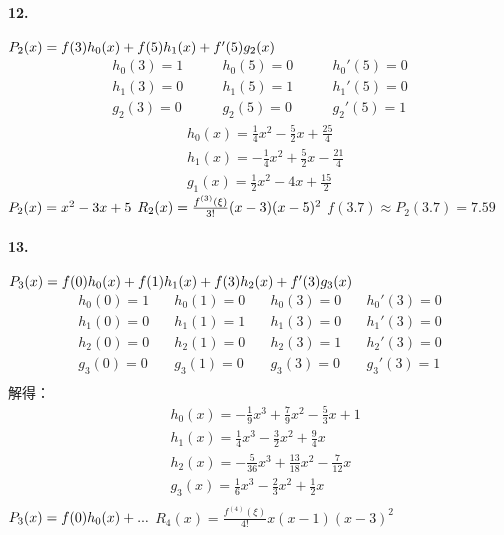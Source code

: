 \documentclass[UTF8]{ctexart}
\begin{document}
	\paragraph{12.}
		$P_2(x)=f(3)h_0(x)+f(5)h_1(x)+f'(5)g_2(x)\\$
		\begin{displaymath}
		\begin{aligned}
			h_0(3)=1\qquad&h_0(5)=0\qquad&h_0'(5)=0\\
			h_1(3)=0\qquad&h_1(5)=1\qquad&h_1'(5)=0\\
			g_2(3)=0\qquad&g_2(5)=0\qquad&g_2'(5)=1
		\end{aligned}
		\end{displaymath}
		\begin{displaymath}
		\begin{aligned}
			&h_0(x)=\frac{1}{4}x^2-\frac{5}{2}x+\frac{25}{4}\\
			&h_1(x)=-\frac{1}{4}x^2+\frac{5}{2}x-\frac{21}{4}\\
			&g_1(x)=\frac{1}{2}x^2-4x+\frac{15}{2}
		\end{aligned}
		\end{displaymath}
		$P_2(x)=x^2-3x+5\\$
		$R_2(x)=\frac{f^{(3)}(\xi)}{3!}(x-3)(x-5)^2\\$
		$f(3.7)\approx P_2(3.7)=7.59$
		
	\paragraph{13.}
		$P_3(x)=f(0)h_0(x)+f(1)h_1(x)+f(3)h_2(x)+f'(3)g_3(x)\\$
		\begin{displaymath}
			\begin{aligned}
				h_0(0)=1\quad&h_0(1)=0\quad&h_0(3)=0\quad&h_0'(3)=0\\
				h_1(0)=0\quad&h_1(1)=1\quad&h_1(3)=0\quad&h_1'(3)=0\\
				h_2(0)=0\quad&h_2(1)=0\quad&h_2(3)=1\quad&h_2'(3)=0\\
				g_3(0)=0\quad&g_3(1)=0\quad&g_3(3)=0\quad&g_3'(3)=1\\
			\end{aligned}
		\end{displaymath}
		解得：
		\begin{displaymath}
			\begin{aligned}
				&h_0(x)=-\frac{1}{9}x^3+\frac{7}{9}x^2-\frac{5}{3}x+1\\
				&h_1(x)=\frac{1}{4}x^3-\frac{3}{2}x^2+\frac{9}{4}x\\
				&h_2(x)=-\frac{5}{36}x^3+\frac{13}{18}x^2-\frac{7}{12}x\\
				&g_3(x)=\frac{1}{6}x^3-\frac{2}{3}x^2+\frac{1}{2}x\\
			\end{aligned}
		\end{displaymath}
		$P_3(x)=f(0)h_0(x)+...\\$
		$R_4(x)=\frac{f^(4)(\xi)}{4!}x(x-1)(x-3)^2$
		
\end{document}
